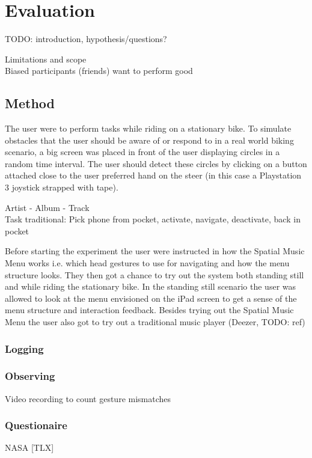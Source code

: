 \chapter{Evaluation}
TODO: introduction, hypothesis/questions?

Limitations and scope\\
Biased participants (friends) want to perform good

\section{Method}
The user were to perform tasks while riding on a stationary bike. To simulate obstacles that the user should be aware of or respond to in a real world biking scenario, a big screen was placed in front of the user displaying circles in a random time interval. The user should detect these circles by clicking on a button attached close to the user preferred hand on the steer (in this case a Playstation 3 joystick strapped with tape).

Artist - Album - Track\\
Task traditional: Pick phone from pocket, activate, navigate, deactivate, back in pocket

Before starting the experiment the user were instructed in how the Spatial Music Menu works i.e. which head gestures to use for navigating and how the menu structure looks. They then got a chance to try out the system both standing still and while riding the stationary bike. In the standing still scenario the user was allowed to look at the menu envisioned on the iPad screen to get a sense of the menu structure and interaction feedback. Besides trying out the Spatial Music Menu the user also got to try out a traditional music player (Deezer, TODO: ref)

\subsection{Logging}

\subsection{Observing}
Video recording to count gesture mismatches

\subsection{Questionaire}
NASA [TLX]


